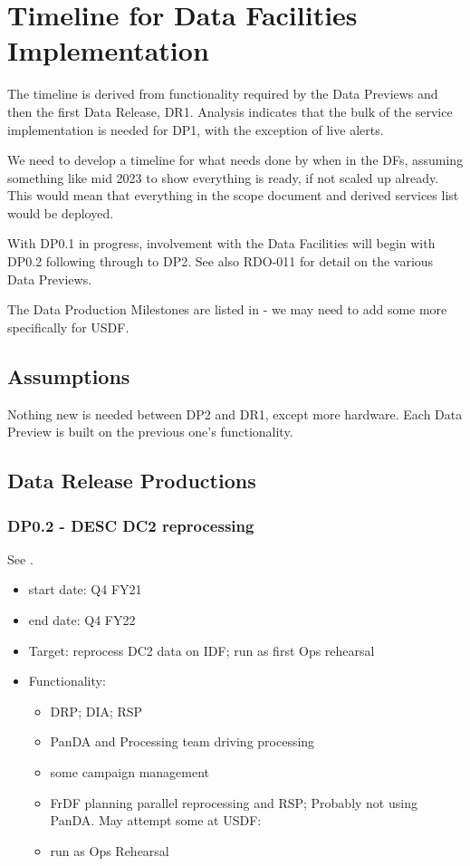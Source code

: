 
\section{Timeline for Data Facilities Implementation}\label{sec:timeline}

The timeline is derived from functionality required by the Data
Previews and then the first Data \gls{Release}, DR1. Analysis indicates that
the bulk of the service implementation is needed for \gls{DP1}, with the
exception of live alerts.

We need to develop a timeline for what needs done by when in the DFs, assuming something like mid 2023 to show everything is ready, if not scaled up already.
This would mean that everything in the scope document and derived services list would be deployed.

With \gls{DP0}.1 in progress, involvement with the Data Facilities will
begin with \gls{DP0}.2  following through to \gls{DP2}.
See also \gls{RDO}-011 for detail on the various Data Previews.

The Data Production Milestones are listed in  - we may need to add some more specifically for \gls{USDF}.


\subsection{Assumptions}

Nothing new is needed between \gls{DP2} and \gls{DR1}, except more
hardware. Each Data Preview is built on the previous one's functionality.

\subsection{Data \gls{Release} Productions}
\subsubsection{ \gls{DP0}.2 - \gls{DESC} DC2 reprocessing}
See .
\begin{itemize}
\item start date: Q4 \gls{FY21}
\item end date: Q4 \gls{FY22}
\item Target: reprocess \gls{DC2} data on \gls{IDF}; run as first Ops rehearsal
\item Functionality:
\begin{itemize}
\item \gls{DRP}; \gls{DIA}; \gls{RSP}
\item \gls{PanDA} and Processing team driving processing
\item some campaign management
\item \gls{FrDF} planning parallel reprocessing and RSP; Probably not using
  \gls{PanDA}. May attempt some at \gls{USDF}:
\item run as Ops Rehearsal
\end{itemize}
\end{itemize}
